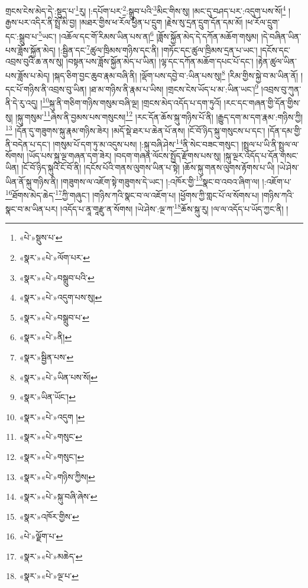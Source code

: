 གྲངས་ངེས་མེད་དེ་:སྡུད་པ་\footnote{«པེ་»སྡུས་པ་}རུ། །:དཔོག་པར་\footnote{«སྣར་»«པེ་»ལོག་པར་}:སྒྲུབ་པའི་\footnote{«སྣར་»«པེ་»བསྒྲུབ་པའི་}མིང་གིས་སུ། །མང་དུ་བཤད་པར་:འདུག་པས་སོ།\footnote{«སྣར་»«པེ་»འདུག་པས་སུ།} །རྒྱས་པར་འདིར་ནི་སྤྲོ་མི་བྱ། །མཐར་གྱིས་ཕ་རོལ་ཕྱིན་པ་དྲུག །རྗེས་སུ་དྲན་དྲུག་དོན་དམ་མོ། །ཕ་རོལ་དྲུག་དང་:སྒྲུབ་པ་\footnote{«སྣར་»«པེ་»བསྒྲུབ་པ་}ཡང་། །འཆོལ་དང་གོ་རིམས་ཡིན་པས་ན།\footnote{«སྣར་»«པེ་»ནི།} །ཟློས་སྐྱོན་མེད་དེ་དཀོན་མཆོག་གསུམ། །དེ་བཞིན་ཡིན་པས་ཟློས་སྐྱོན་མེད། །:སྦྱིན་དང་\footnote{«སྣར་»སྦྱིན་པས་}ཚུལ་ཁྲིམས་གཉིས་དང་ནི། །གཏོང་དང་ཚུལ་ཁྲིམས་དྲན་པ་ཡང་། །དངོས་དང་འབྲས་བུའི་ཆ་ནས་སུ། །བསྟན་པས་ཟློས་སྐྱོན་མེད་པ་ཡིན། །ལྷ་དང་དཀོན་མཆོག་དཔང་པོ་དང་། །རྟེན་ཚུལ་ཡིན་པས་ཟློས་པ་མེད། །སྐད་ཅིག་བྱང་ཆུབ་རྣམ་བཞི་ནི། །ལྡོག་པས་དབྱེ་བ་:ཡིན་པས་སུ།\footnote{«སྣར་»«པེ་»ཡིན་པས་སོ།} །རིམ་གྱིས་སྐྱེ་བ་མ་ཡིན་ནོ། །དང་པོ་གཉིས་ནི་འབྲས་བུ་ཡིན། །ཐ་མ་གཉིས་ནི་རྣམ་པ་ཡིས། །གྲངས་ངེས་ཡོད་པ་མ་:ཡིན་ཡང་།\footnote{«སྣར་»ཡིན་ཡོང་།} །འབྲས་བུ་ཀུན་ནི་དེ་རུ་འདུ། །\footnote{«སྣར་»«པེ་»འདུག །}སྐུ་ནི་གཅིག་གཉིས་གསུམ་བཞི་ལྔ། །གྲངས་མེད་འདོད་པ་དག་ཏུའོ། །རང་དང་གཞན་གྱི་དོན་གྱིས་སུ། །སྐུ་གསུམ་\footnote{«སྣར་»«པེ་»གསུང་}ཞེས་ནི་བྱམས་པས་གསུངས།\footnote{«སྣར་»«པེ་»གསུང་།} །རང་དོན་ཆོས་སྐུ་གཉིས་པོ་ནི། །རྒྱུད་དག་མ་དག་རྣམ་:གཉིས་ཀྱི།\footnote{«སྣར་»«པེ་»གཉིས་ཀྱིས།} །དོན་དུ་གཟུགས་སྐུ་རྣམ་གཉིས་ཟེར། །མདོ་སྡེ་ཐར་པ་ཆེན་པོ་ནས། །ངོ་བོ་ཉིད་སྐུ་གསུངས་པ་དང་། །དོན་དམ་གྱི་ནི་བདེན་པ་དང་། །གསུམ་པོ་དག་ཏུ་མ་འདུས་པས། །:སྐུ་བཞི་ཤེས་\footnote{«སྣར་»«པེ་»སྐུ་བཞི་ཞེས་}ནི་སེང་བཟང་གསུང་། །སྤྲུལ་པ་ཡི་ནི་སྤྲུལ་ལ་སོགས། །ཡོད་པས་སྐུ་ལྔ་གཞན་དག་ཟེར། །བདག་གཞན་ལོངས་སྤྱོད་རྫོགས་པས་སུ། །སྐུ་ལྔར་འདོད་པ་དོན་གསང་ཡིན། །ངོ་བོ་ཉིད་སྐུའི་ངོ་བོ་ནི། །དངོས་པོའི་གནས་ལུགས་ཡིན་པ་སྟེ། །ཆོས་སྐུ་གནས་ལུགས་རྟོགས་པ་ཡི། །ཡེ་ཤེས་ཡིན་ནོ་སྐུ་གཉིས་ནི། །གཟུགས་ལ་འཇོག་སྟེ་གཟུགས་དེ་ཡང་། །:འཁོར་གྱི་\footnote{«སྣར་»འཁོར་གྱིས་}སྣང་བ་འབའ་ཞིག་ལ། །:འཇོག་པ་\footnote{«པེ་»ལྗོག་པ་}ཐོགས་མེད་ཆེད་\footnote{«སྣར་»«པེ་»མཆེད་}ཀྱི་གཞུང་། །གཉིས་ཀའི་སྣང་བ་ལ་འཇོག་པ། །ཕྱོགས་ཀྱི་གླང་པོ་ལ་སོགས་པ། །གཉིས་ཀའི་སྣང་བ་མ་ཡིན་པར། །འདོད་པ་ནཱ་གཱརྫུ་ན་སོགས། །ཡེ་ཤེས་:ལྔ་ཀ་\footnote{«སྣར་»«པེ་»ལྔ་པ་}ཆོས་སྐུ་རུ། །ལ་ལ་འདོད་པ་ཡོད་ཀྱང་ནི། །
